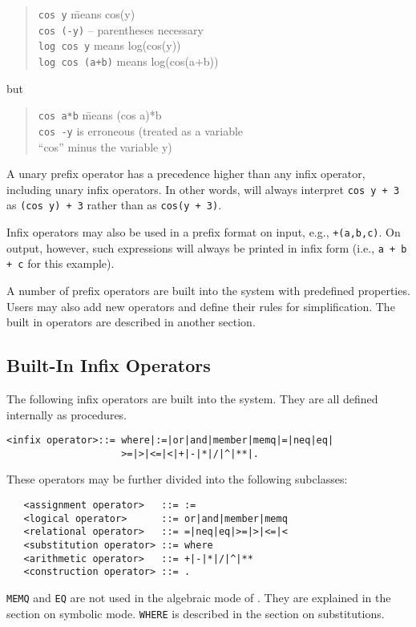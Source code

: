 \begin{quote}
\begin{tabbing}
{\tt cos y} \hspace{1.75in} \= means cos(y) \\
{\tt cos (-y)} \> -- parentheses necessary \\
{\tt log cos y} \>   means log(cos(y)) \\
{\tt log cos (a+b)} \> means log(cos(a+b))
\end{tabbing}
\end{quote}
but
\begin{quote}
\begin{tabbing}
{\tt cos a*b} \hspace{1.6in} \= means (cos a)*b \\
{\tt cos -y}  \> is erroneous (treated as a variable \\
\> ``cos'' minus the variable y)
\end{tabbing}
\end{quote}
A unary prefix operator has a precedence
 higher than any infix operator, including
unary infix operators. 
In other words, {\REDUCE} will always interpret {\tt cos~y + 3} as
{\tt (cos~y) + 3} rather than as {\tt cos(y + 3)}.

Infix operators may also be used in a prefix format on input, e.g.,
{\tt +(a,b,c)}.  On output, however, such expressions will always be
printed in infix form (i.e., {\tt a + b + c} for this example).

A number of prefix operators are built into the system with predefined
properties. Users may also add new operators and define their rules for
simplification. The built in operators are described in another section.

\subsection*{Built-In Infix Operators}

The following infix operators are built into the
system.  They are all defined internally as procedures.
\begin{verbatim}
<infix operator>::= where|:=|or|and|member|memq|=|neq|eq|
                    >=|>|<=|<|+|-|*|/|^|**|.
\end{verbatim}
These operators may be further divided into the following subclasses:
\begin{verbatim}
   <assignment operator>   ::= :=
   <logical operator>      ::= or|and|member|memq
   <relational operator>   ::= =|neq|eq|>=|>|<=|<
   <substitution operator> ::= where
   <arithmetic operator>   ::= +|-|*|/|^|**
   <construction operator> ::= .
\end{verbatim}
{\tt MEMQ} and {\tt EQ} are not used in the algebraic mode of
{\REDUCE}.  They are explained in the section on symbolic mode.
{\tt WHERE} is described in the section on substitutions.

